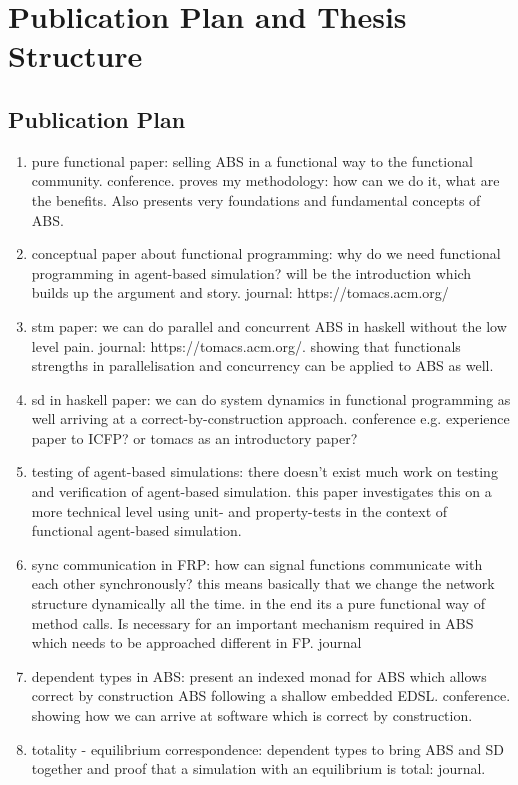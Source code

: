 \chapter{Publication Plan and Thesis Structure}

\section{Publication Plan}
\begin{enumerate}
	\item pure functional paper: selling ABS in a functional way to the functional community. conference. proves my methodology: how can we do it, what are the benefits. Also presents very foundations and fundamental concepts of ABS.
	
	\item conceptual paper about functional programming: why do we need functional programming in agent-based simulation? will be the introduction which builds up the argument and story. journal: https://tomacs.acm.org/
	
	\item stm paper: we can do parallel and concurrent ABS in haskell without the low level pain. journal: https://tomacs.acm.org/. showing that functionals strengths in parallelisation and concurrency can be applied to ABS as well.
	
	\item sd in haskell paper: we can do system dynamics in functional programming as well arriving at a correct-by-construction approach. conference e.g. experience paper to ICFP? or tomacs as an introductory paper?
	
	\item testing of agent-based simulations: there doesn't exist much work on testing and verification of agent-based simulation. this paper investigates this on a more technical level using unit- and property-tests in the context of functional agent-based simulation.

	\item sync communication in FRP: how can signal functions communicate with each other synchronously? this means basically that we change the network structure dynamically all the time. in the end its a pure functional way of method calls. Is necessary for an important mechanism required in ABS which needs to be approached different in FP. journal
	
	\item dependent types in ABS: present an indexed monad for ABS which allows correct by construction ABS following a shallow embedded EDSL. conference. showing how we can arrive at software which is correct by construction.
	
	\item totality - equilibrium correspondence: dependent types to bring ABS and SD together and proof that a simulation with an equilibrium is total: journal. 
\end{enumerate}